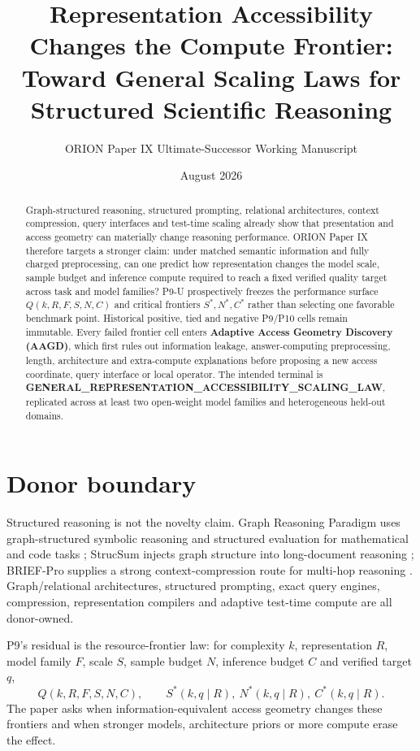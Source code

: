 \documentclass[11pt]{article}
\title{Representation Accessibility Changes the Compute Frontier:\\
Toward General Scaling Laws for Structured Scientific Reasoning}
\author{ORION Paper IX Ultimate-Successor Working Manuscript}
\date{August 2026}
\begin{document}
\maketitle

\begin{abstract}
Graph-structured reasoning, structured prompting, relational architectures, context compression, query interfaces and test-time scaling already show that presentation and access geometry can materially change reasoning performance. ORION Paper IX therefore targets a stronger claim: under matched semantic information and fully charged preprocessing, can one predict how representation changes the model scale, sample budget and inference compute required to reach a fixed verified quality target across task and model families? P9-U prospectively freezes the performance surface $Q(k,R,F,S,N,C)$ and critical frontiers $S^*,N^*,C^*$ rather than selecting one favorable benchmark point. Historical positive, tied and negative P9/P10 cells remain immutable. Every failed frontier cell enters \textbf{Adaptive Access Geometry Discovery (AAGD)}, which first rules out information leakage, answer-computing preprocessing, length, architecture and extra-compute explanations before proposing a new access coordinate, query interface or local operator. The intended terminal is \textbf{GENERAL\_REPRESENTATION\_ACCESSIBILITY\_SCALING\_LAW}, replicated across at least two open-weight model families and heterogeneous held-out domains.
\end{abstract}

\section{Donor boundary}
Structured reasoning is not the novelty claim. Graph Reasoning Paradigm uses graph-structured symbolic reasoning and structured evaluation for mathematical and code tasks \cite{grp2026}; StrucSum injects graph structure into long-document reasoning \cite{strucsum2026}; BRIEF-Pro supplies a strong context-compression route for multi-hop reasoning \cite{brief2026}. Graph/relational architectures, structured prompting, exact query engines, compression, representation compilers and adaptive test-time compute are all donor-owned.

P9's residual is the resource-frontier law: for complexity $k$, representation $R$, model family $F$, scale $S$, sample budget $N$, inference budget $C$ and verified target $q$,
\[
Q(k,R,F,S,N,C),\qquad S^*(k,q\mid R),\ N^*(k,q\mid R),\ C^*(k,q\mid R).
\]
The paper asks when information-equivalent access geometry changes these frontiers and when stronger models, architecture priors or more compute erase the effect.
\end{document}
